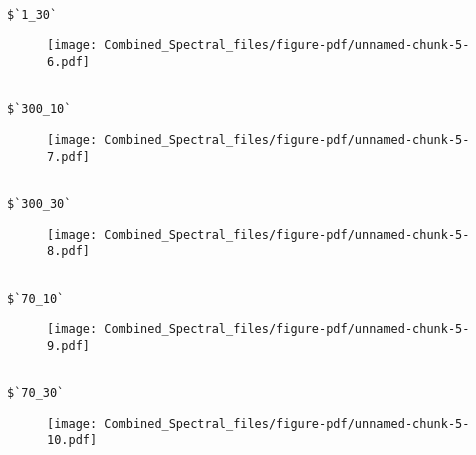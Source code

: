 \documentclass[
  letterpaper,
  DIV=11,
  numbers=noendperiod]{scrartcl}
\begin{document}
\begin{verbatim}

$`1_30`
\end{verbatim}

\begin{figure}[H]

{\centering \texttt{[image: Combined\_Spectral\_files/figure-pdf/unnamed-chunk-5-6.pdf]}

}

\end{figure}

\begin{verbatim}

$`300_10`
\end{verbatim}

\begin{figure}[H]

{\centering \texttt{[image: Combined\_Spectral\_files/figure-pdf/unnamed-chunk-5-7.pdf]}

}

\end{figure}

\begin{verbatim}

$`300_30`
\end{verbatim}

\begin{figure}[H]

{\centering \texttt{[image: Combined\_Spectral\_files/figure-pdf/unnamed-chunk-5-8.pdf]}

}

\end{figure}

\begin{verbatim}

$`70_10`
\end{verbatim}

\begin{figure}[H]

{\centering \texttt{[image: Combined\_Spectral\_files/figure-pdf/unnamed-chunk-5-9.pdf]}

}

\end{figure}

\begin{verbatim}

$`70_30`
\end{verbatim}

\begin{figure}[H]

{\centering \texttt{[image: Combined\_Spectral\_files/figure-pdf/unnamed-chunk-5-10.pdf]}

}

\end{figure}
\end{document}

